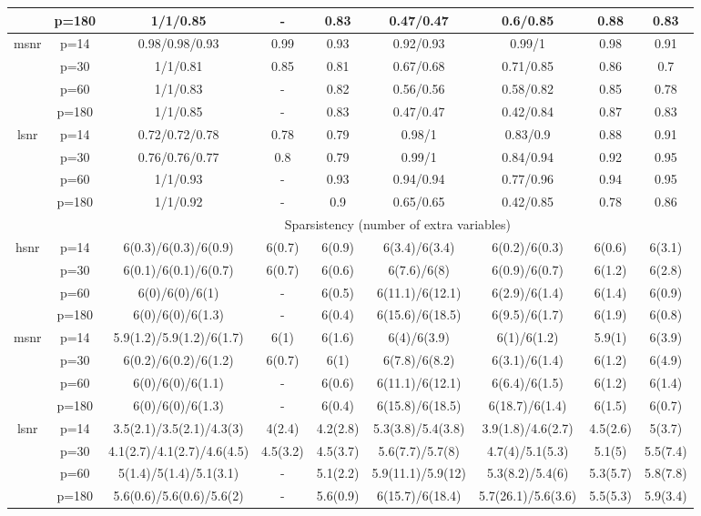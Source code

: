 \begin{table}[ht]
{\begin{tabular}{|c|c|ccccccc|}
   & p=180 & 1/1/0.85 & - & 0.83 & 0.47/0.47 & 0.6/0.85 & 0.88 & 0.83 \\ 
  \midrule\multirow{4}[2]{*}{msnr} & p=14 & 0.98/0.98/0.93 & 0.99 & 0.93 & 0.92/0.93 & 0.99/1 & 0.98 & 0.91 \\ 
   & p=30 & 1/1/0.81 & 0.85 & 0.81 & 0.67/0.68 & 0.71/0.85 & 0.86 & 0.7 \\ 
   & p=60 & 1/1/0.83 & - & 0.82 & 0.56/0.56 & 0.58/0.82 & 0.85 & 0.78 \\ 
   & p=180 & 1/1/0.85 & - & 0.83 & 0.47/0.47 & 0.42/0.84 & 0.87 & 0.83 \\ 
  \midrule\multirow{4}[2]{*}{lsnr} & p=14 & 0.72/0.72/0.78 & 0.78 & 0.79 & 0.98/1 & 0.83/0.9 & 0.88 & 0.91 \\ 
   & p=30 & 0.76/0.76/0.77 & 0.8 & 0.79 & 0.99/1 & 0.84/0.94 & 0.92 & 0.95 \\ 
   & p=60 & 1/1/0.93 & - & 0.93 & 0.94/0.94 & 0.77/0.96 & 0.94 & 0.95 \\ 
   & p=180 & 1/1/0.92 & - & 0.9 & 0.65/0.65 & 0.42/0.85 & 0.78 & 0.86 \\ 
   \midrule 
 \multicolumn{1}{|c}{} &       & \multicolumn{7}{c|}{Sparsistency (number of extra variables)} \\
\midrule\multirow{4}[2]{*}{hsnr} & p=14 & 6(0.3)/6(0.3)/6(0.9) & 6(0.7) & 6(0.9) & 6(3.4)/6(3.4) & 6(0.2)/6(0.3) & 6(0.6) & 6(3.1) \\ 
   & p=30 & 6(0.1)/6(0.1)/6(0.7) & 6(0.7) & 6(0.6) & 6(7.6)/6(8) & 6(0.9)/6(0.7) & 6(1.2) & 6(2.8) \\ 
   & p=60 & 6(0)/6(0)/6(1) & - & 6(0.5) & 6(11.1)/6(12.1) & 6(2.9)/6(1.4) & 6(1.4) & 6(0.9) \\ 
   & p=180 & 6(0)/6(0)/6(1.3) & - & 6(0.4) & 6(15.6)/6(18.5) & 6(9.5)/6(1.7) & 6(1.9) & 6(0.8) \\ 
  \midrule\multirow{4}[2]{*}{msnr} & p=14 & 5.9(1.2)/5.9(1.2)/6(1.7) & 6(1) & 6(1.6) & 6(4)/6(3.9) & 6(1)/6(1.2) & 5.9(1) & 6(3.9) \\ 
   & p=30 & 6(0.2)/6(0.2)/6(1.2) & 6(0.7) & 6(1) & 6(7.8)/6(8.2) & 6(3.1)/6(1.4) & 6(1.2) & 6(4.9) \\ 
   & p=60 & 6(0)/6(0)/6(1.1) & - & 6(0.6) & 6(11.1)/6(12.1) & 6(6.4)/6(1.5) & 6(1.2) & 6(1.4) \\ 
   & p=180 & 6(0)/6(0)/6(1.3) & - & 6(0.4) & 6(15.8)/6(18.5) & 6(18.7)/6(1.4) & 6(1.5) & 6(0.7) \\ 
  \midrule\multirow{4}[2]{*}{lsnr} & p=14 & 3.5(2.1)/3.5(2.1)/4.3(3) & 4(2.4) & 4.2(2.8) & 5.3(3.8)/5.4(3.8) & 3.9(1.8)/4.6(2.7) & 4.5(2.6) & 5(3.7) \\ 
   & p=30 & 4.1(2.7)/4.1(2.7)/4.6(4.5) & 4.5(3.2) & 4.5(3.7) & 5.6(7.7)/5.7(8) & 4.7(4)/5.1(5.3) & 5.1(5) & 5.5(7.4) \\ 
   & p=60 & 5(1.4)/5(1.4)/5.1(3.1) & - & 5.1(2.2) & 5.9(11.1)/5.9(12) & 5.3(8.2)/5.4(6) & 5.3(5.7) & 5.8(7.8) \\ 
   & p=180 & 5.6(0.6)/5.6(0.6)/5.6(2) & - & 5.6(0.9) & 6(15.7)/6(18.4) & 5.7(26.1)/5.6(3.6) & 5.5(5.3) & 5.9(3.4) \\ 
   \bottomrule 
\end{tabular}
}
\end{table}
